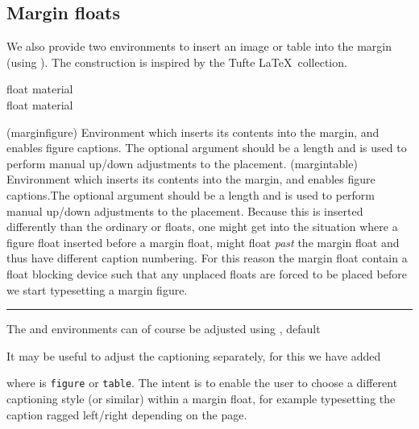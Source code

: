 \subsection{Margin floats}
\label{sec:margin-floats}

We also provide two environments to insert an image or table into the
margin (using \cmd{\marginpar}). The construction is inspired by the
Tufte \LaTeX\ collection.
\begin{syntax}
   float material  \\
   float material  \\
\end{syntax}
\glossary(marginfigure)%
  {}%
  {Environment which inserts its contents into the margin, and enables
  figure captions. The optional argument should be a length and is used
to perform manual up/down adjustments to the placement.}
\glossary(margintable)%
  {}%
  {Environment which inserts its contents into the margin, and enables
  figure captions.The optional argument should be a length and is used
to perform manual up/down adjustments to the placement.}
Because this is inserted differently than the ordinary  or
 floats, one might get into the situation where a figure
float inserted before a margin float, might float \emph{past} the
margin float and thus have different caption numbering. For this
reason the margin float contain a float blocking device such that any
unplaced floats are forced to be placed before we start typesetting a
margin figure.

\fancybreak{}

The  and  environments can of course
be adjusted using \cmd{\setfloatadjustment}, default
\begin{lcode}
\end{lcode}
It may be useful to adjust the captioning separately, for this we have
added
\begin{syntax}
  \cmd{\setmarginfloatcaptionadjustment}
\end{syntax}
where  is \verb?figure? or \verb?table?. The intent is to
enable the user to choose a different captioning style (or similar)
within a margin float, for example typesetting the caption ragged
left/right depending on the page.

